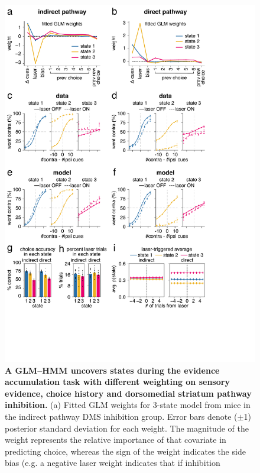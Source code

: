 \begin{figure}[t!]
  \begin{center}
    \includegraphics[width=0.80\linewidth]{ch2-glmhmm/glmhmm-figures/Fig6.pdf}
    \caption[A GLM–HMM uncovers states during the evidence accumulation task with different weighting on sensory evidence, choice history and dorsomedial striatum pathway inhibition]{\textbf{A GLM–HMM uncovers states during the evidence accumulation task with different weighting on sensory evidence, choice history and dorsomedial striatum pathway inhibition.} (a) Fitted GLM weights for 3-state model from mice in the indirect pathway DMS inhibition group. Error bars denote ($\pm$1) posterior standard deviation for each weight. The magnitude of the weight represents the relative importance of that covariate in predicting choice, whereas the sign of the weight indicates the side bias (e.g. a negative laser weight indicates that if inhibition}
    \label{fig:glmhmm:6}
  \end{center}
  \vspace{-1.5cm}
\end{figure}
